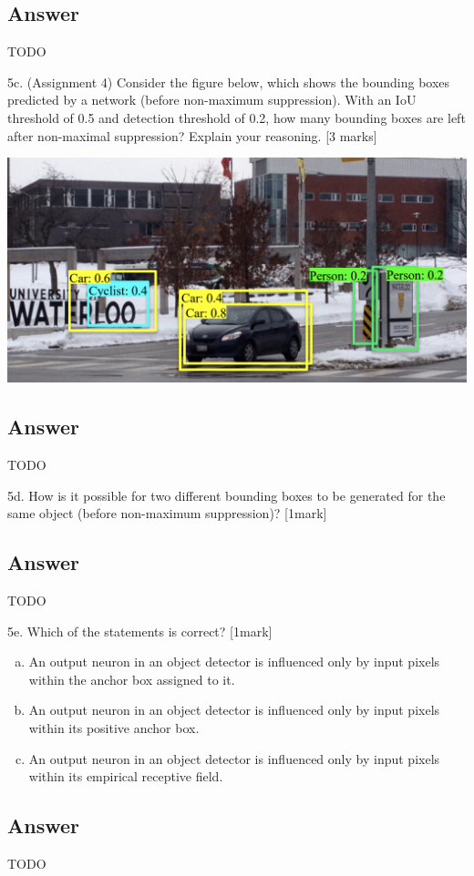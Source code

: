 \documentclass[
	12pt, %
]{fphw}
\begin{document}
\subsection*{Answer}
TODO
\begin{problem}
5c. (Assignment 4) Consider the figure below, which shows the bounding boxes
predicted by a network (before non-maximum suppression). With an IoU threshold of 0.5
and detection threshold of 0.2, how many bounding boxes are left after non-maximal
suppression? Explain your reasoning. [3 marks]
\begin{center}
	\includegraphics[width=0.75\columnwidth, page=1]{5c.png} %
\end{center}
\end{problem}
\subsection*{Answer}
TODO
\begin{problem}
5d. How is it possible for two different bounding boxes to be generated for the same
object (before non-maximum suppression)? [1mark]
\end{problem}
\subsection*{Answer}
TODO
\begin{problem}
5e. Which of the statements is correct? [1mark]
\begin{enumerate}[a)] %
	\item An output neuron in an object detector is influenced only by input pixels within
	      the anchor box assigned to it.
	\item An output neuron in an object detector is influenced only by input pixels within
	      its positive anchor box.
	\item An output neuron in an object detector is influenced only by input pixels within
	      its empirical receptive field.
\end{enumerate}
\end{problem}
\subsection*{Answer}
TODO
\end{document}
